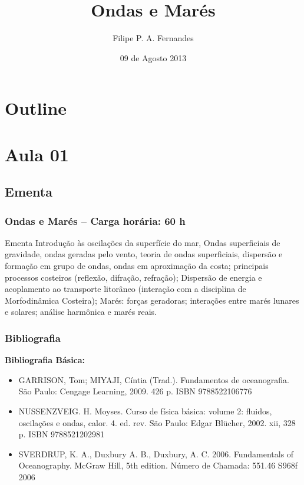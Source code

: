 \title[Aula 01]{Ondas e Marés}
\author[Filipe Fernandes]{Filipe P. A. Fernandes}
\date[Agosto 2013]{09 de Agosto 2013}




\begin{frame}[plain]
  \titlepage
\end{frame}

\section*{Outline}
\begin{frame}
\tableofcontents
\end{frame}


\section{Aula 01}
\subsection{Ementa}
\begin{frame}
    \frametitle{Ondas e Marés -- Carga horária: 60 h}
    {\small
    \begin{block}{Ementa}
        Introdução às oscilações da superfície do mar, Ondas superficiais de
        gravidade, ondas geradas pelo vento, teoria de ondas superficiais,
        dispersão e formação em grupo de ondas, ondas em aproximação da costa;
        principais processos costeiros (reflexão, difração, refração);
        Dispersão de energia e acoplamento ao transporte litorâneo (interação
        com a disciplina de Morfodinâmica Costeira); Marés: forças geradoras;
        interações entre marés lunares e solares; análise harmônica e marés reais.
    \end{block}
    }
\end{frame}

\begin{frame}
    \frametitle{Bibliografia}
    {\scriptsize
    {\bf Bibliografia Básica:}
        \begin{itemize}[<+-| alert@+>]
            \item GARRISON, Tom; MIYAJI, Cíntia (Trad.). Fundamentos de
                  oceanografia. São Paulo: Cengage Learning, 2009. 426 p.
                  ISBN 9788522106776
            \item NUSSENZVEIG. H. Moyses. Curso de física básica: volume 2:
                  fluidos, oscilações e ondas, calor. 4. ed. rev. São Paulo:
                  Edgar Blücher, 2002. xii, 328 p. ISBN 9788521202981
            \item SVERDRUP, K. A., Duxbury A. B., Duxbury, A. C. 2006.
                  Fundamentals of Oceanography. McGraw Hill, 5th edition.
                  Número de Chamada: 551.46 S968f 2006
        \end{itemize}
    }
\end{frame}

